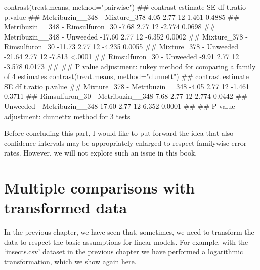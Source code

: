 \documentclass[a4paper,12pt,oneside]{book}
\newenvironment{Shaded}{\begin{snugshade}}{\end{snugshade}}
\newcommand{\StringTok}[1]{#1}
\newcommand{\DocumentationTok}[1]{#1}
\newcommand{\FunctionTok}[1]{#1}
\newcommand{\AttributeTok}[1]{#1}
\newcommand{\NormalTok}[1]{#1}
\begin{document}
\small

\begin{Shaded}
\begin{Highlighting}[]
\FunctionTok{contrast}\NormalTok{(treat.means, }\AttributeTok{method=}\StringTok{"pairwise"}\NormalTok{)}
\DocumentationTok{\#\#  contrast                         estimate   SE df t.ratio p.value}
\DocumentationTok{\#\#  Metribuzin\_\_348 {-} Mixture\_378        4.05 2.77 12   1.461  0.4885}
\DocumentationTok{\#\#  Metribuzin\_\_348 {-} Rimsulfuron\_30    {-}7.68 2.77 12  {-}2.774  0.0698}
\DocumentationTok{\#\#  Metribuzin\_\_348 {-} Unweeded         {-}17.60 2.77 12  {-}6.352  0.0002}
\DocumentationTok{\#\#  Mixture\_378 {-} Rimsulfuron\_30       {-}11.73 2.77 12  {-}4.235  0.0055}
\DocumentationTok{\#\#  Mixture\_378 {-} Unweeded             {-}21.64 2.77 12  {-}7.813  \textless{}.0001}
\DocumentationTok{\#\#  Rimsulfuron\_30 {-} Unweeded           {-}9.91 2.77 12  {-}3.578  0.0173}
\DocumentationTok{\#\# }
\DocumentationTok{\#\# P value adjustment: tukey method for comparing a family of 4 estimates}
\FunctionTok{contrast}\NormalTok{(treat.means, }\AttributeTok{method=}\StringTok{"dunnett"}\NormalTok{)}
\DocumentationTok{\#\#  contrast                         estimate   SE df t.ratio p.value}
\DocumentationTok{\#\#  Mixture\_378 {-} Metribuzin\_\_348       {-}4.05 2.77 12  {-}1.461  0.3711}
\DocumentationTok{\#\#  Rimsulfuron\_30 {-} Metribuzin\_\_348     7.68 2.77 12   2.774  0.0442}
\DocumentationTok{\#\#  Unweeded {-} Metribuzin\_\_348          17.60 2.77 12   6.352  0.0001}
\DocumentationTok{\#\# }
\DocumentationTok{\#\# P value adjustment: dunnettx method for 3 tests}
\end{Highlighting}
\end{Shaded}

\normalsize

Before concluding this part, I would like to put forward the idea that also confidence intervals may be appropriately enlarged to respect familywise error rates. However, we will not explore such an issue in this book.

\hypertarget{multiple-comparisons-with-transformed-data}{%
\section{Multiple comparisons with transformed data}\label{multiple-comparisons-with-transformed-data}}

In the previous chapter, we have seen that, sometimes, we need to transform the data to respect the basic assumptions for linear models. For example, with the `insects.csv' dataset in the previous chapter we have performed a logarithmic transformation, which we show again here.
\end{document}
